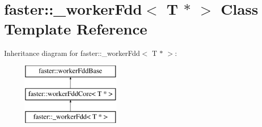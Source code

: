 \hypertarget{classfaster_1_1__workerFdd_3_01T_01_5_01_4}{}\section{faster\+:\+:\+\_\+worker\+Fdd$<$ T $\ast$ $>$ Class Template Reference}
\label{classfaster_1_1__workerFdd_3_01T_01_5_01_4}
Inheritance diagram for faster\+:\+:\+\_\+worker\+Fdd$<$ T $\ast$ $>$\+:\begin{figure}[H]
\begin{center}
\leavevmode
\includegraphics[height=3.000000cm]{classfaster_1_1__workerFdd_3_01T_01_5_01_4}
\end{center}
\end{figure}
